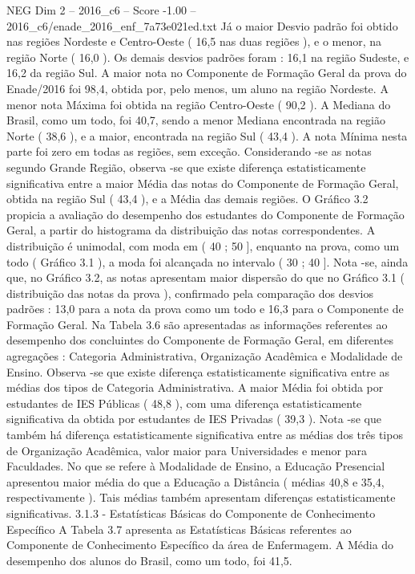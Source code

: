 \begin{textsample}{NEG Dim 2 – 2016\_c6 – Score -1.00 – 2016\_c6/enade\_2016\_enf\_7a73e021ed.txt}
Já o maior Desvio padrão foi obtido nas regiões Nordeste e Centro-Oeste ( 16,5 nas duas regiões ), e o menor, na região Norte ( 16,0 ).
Os demais desvios padrões foram : 16,1 na região Sudeste, e 16,2 da região Sul.
A maior nota no Componente de Formação Geral da prova do Enade/2016 foi 98,4, obtida por, pelo menos, um aluno na região Nordeste.
A menor nota Máxima foi obtida na região Centro-Oeste ( 90,2 ).
A Mediana do Brasil, como um todo, foi 40,7, sendo a menor Mediana encontrada na região Norte ( 38,6 ), e a maior, encontrada na região Sul ( 43,4 ).
A nota Mínima nesta parte foi zero em todas as regiões, sem exceção.
Considerando -se as notas segundo Grande Região, observa -se que existe diferença estatisticamente significativa entre a maior Média das notas do Componente de Formação Geral, obtida na região Sul ( 43,4 ), e a Média das demais regiões.
O Gráfico 3.2 propicia a avaliação do desempenho dos estudantes do Componente de Formação Geral, a partir do histograma da distribuição das notas correspondentes.
A distribuição é unimodal, com moda em ( 40 ; 50 ], enquanto na prova, como um todo ( Gráfico 3.1 ), a moda foi alcançada no intervalo ( 30 ; 40 ].
Nota -se, ainda que, no Gráfico 3.2, as notas apresentam maior dispersão do que no Gráfico 3.1 ( distribuição das notas da prova ), confirmado pela comparação dos desvios padrões : 13,0 para a nota da prova como um todo e 16,3 para o Componente de Formação Geral.
Na Tabela 3.6 são apresentadas as informações referentes ao desempenho dos concluintes do Componente de Formação Geral, em diferentes agregações : Categoria Administrativa, Organização Acadêmica e Modalidade de Ensino.
Observa -se que existe diferença estatisticamente significativa entre as médias dos tipos de Categoria Administrativa.
A maior Média foi obtida por estudantes de IES Públicas ( 48,8 ), com uma diferença estatisticamente significativa da obtida por estudantes de IES Privadas ( 39,3 ).
Nota -se que também há diferença estatisticamente significativa entre as médias dos três tipos de Organização Acadêmica, valor maior para Universidades e menor para Faculdades.
No que se refere à Modalidade de Ensino, a Educação Presencial apresentou maior média do que a Educação a Distância ( médias 40,8 e 35,4, respectivamente ).
Tais médias também apresentam diferenças estatisticamente significativas. 3.1.3 - Estatísticas Básicas do Componente de Conhecimento Específico A Tabela 3.7 apresenta as Estatísticas Básicas referentes ao Componente de Conhecimento Específico da área de Enfermagem.
A Média do desempenho dos alunos do Brasil, como um todo, foi 41,5.

\end{textsample}
